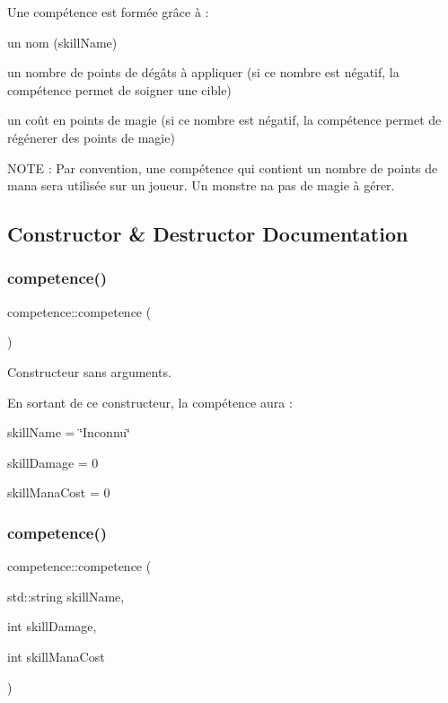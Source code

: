 Une compétence est formée grâce à \+:
\begin{DoxyItemize}
\item un nom ({\ttfamily skill\+Name})
\item un nombre de points de dégâts à appliquer (si ce nombre est négatif, la compétence permet de soigner une cible)
\item un coût en points de magie (si ce nombre est négatif, la compétence permet de régénerer des points de magie)
\end{DoxyItemize}

N\+O\+TE \+: Par convention, une compétence qui contient un nombre de points de mana sera utilisée sur un joueur. Un monstre n\textquotesingle{}a pas de magie à gérer. 

\subsection{Constructor \& Destructor Documentation}
\mbox{\label{classcompetence_ae47bad4331015d873fef6b006b987d38}} 
\subsubsection{\texorpdfstring{competence()}{competence()}\hspace{0.1cm}{\footnotesize\ttfamily [1/3]}}
{\footnotesize\ttfamily competence\+::competence (\begin{DoxyParamCaption}{ }\end{DoxyParamCaption})}



Constructeur sans arguments. 

En sortant de ce constructeur, la compétence aura \+:
\begin{DoxyItemize}
\item skill\+Name = \char`\"{}\+Inconnu\char`\"{}
\item skill\+Damage = 0
\item skill\+Mana\+Cost = 0 
\end{DoxyItemize}\mbox{\label{classcompetence_ae214635d91c8b1c5a37352dccbcd2397}} 
\subsubsection{\texorpdfstring{competence()}{competence()}\hspace{0.1cm}{\footnotesize\ttfamily [2/3]}}
{\footnotesize\ttfamily competence\+::competence (\begin{DoxyParamCaption}\item[{std\+::string}]{skill\+Name,  }\item[{int}]{skill\+Damage,  }\item[{int}]{skill\+Mana\+Cost }\end{DoxyParamCaption})}



